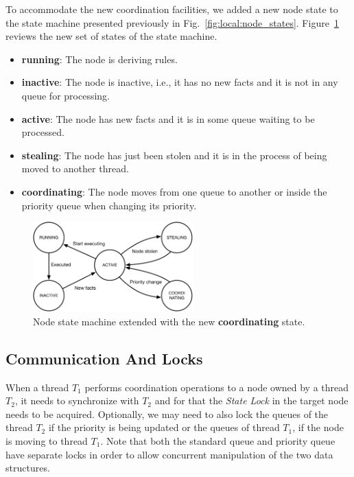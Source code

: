 To accommodate the new coordination facilities, we added a new node state to the
state machine presented previously in Fig.~\ref{fig:local:node_states}.
Figure~\ref{fig:implementation:node_states} reviews the new set of states of
the state machine.

\begin{itemize}
   \item \textbf{running}: The node is deriving rules.
   \item \textbf{inactive}: The node is inactive, i.e., it has no new facts and
      it is not in any
   queue for processing.
   \item \textbf{active}: The node has new facts and it is in some queue waiting
   to be processed.
   \item \textbf{stealing}: The node has just been stolen and it is in the process of being
   moved to another thread.
   \item \textbf{coordinating}: The node moves from one queue to another or
      inside the priority queue when changing its priority.
\end{itemize}

\begin{figure}[ht]
   \centering
   \includegraphics[width=0.55\textwidth]{figures/implementation/node_states.pdf}
   \caption{Node state machine extended with the new \textbf{coordinating}
   state.}
   \label{fig:implementation:node_states}
\end{figure}

\subsection{Communication And Locks}

When a thread $T_1$ performs coordination operations to a node owned by a thread
$T_2$, it needs to synchronize with $T_2$ and for that the \emph{State Lock} in
the target node needs to be acquired. Optionally, we may need to also lock the
queues of the thread $T_2$ if the priority is being updated or the queues of
thread $T_1$, if the node is moving to thread $T_1$. Note that both the standard
queue and priority queue have separate locks in order to allow concurrent
manipulation of the two data structures.

